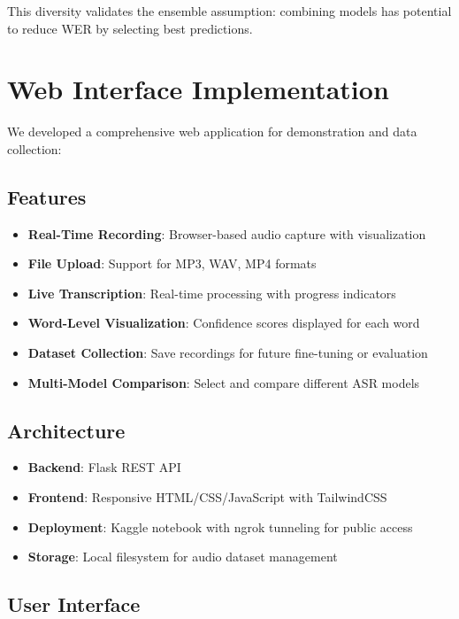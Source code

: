 This diversity validates the ensemble assumption: combining models has potential to reduce WER by selecting best predictions.

\section{Web Interface Implementation}

We developed a comprehensive web application for demonstration and data collection:

\subsection{Features}

\begin{itemize}
    \item \textbf{Real-Time Recording}: Browser-based audio capture with visualization
    \item \textbf{File Upload}: Support for MP3, WAV, MP4 formats
    \item \textbf{Live Transcription}: Real-time processing with progress indicators
    \item \textbf{Word-Level Visualization}: Confidence scores displayed for each word
    \item \textbf{Dataset Collection}: Save recordings for future fine-tuning or evaluation
    \item \textbf{Multi-Model Comparison}: Select and compare different ASR models
\end{itemize}

\subsection{Architecture}

\begin{itemize}
    \item \textbf{Backend}: Flask REST API
    \item \textbf{Frontend}: Responsive HTML/CSS/JavaScript with TailwindCSS
    \item \textbf{Deployment}: Kaggle notebook with ngrok tunneling for public access
    \item \textbf{Storage}: Local filesystem for audio dataset management
\end{itemize}

\subsection{User Interface}

